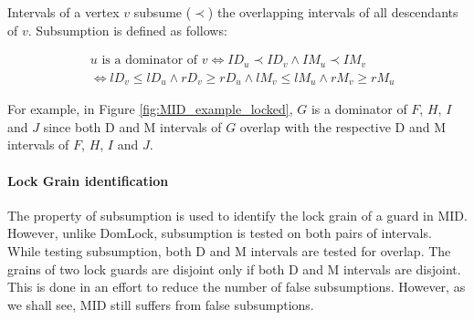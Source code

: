 Intervals of a vertex $v$ subsume ($\prec$) the overlapping intervals of all descendants of $v$. Subsumption is defined as follows:

\begin{equation}
    \begin{split}
        & u \text{ is a dominator of } v \iff ID_u \prec ID_v \land IM_u \prec IM_v
        \\ & \iff lD_v \leq lD_u \land rD_v \geq rD_u \land lM_v \leq lM_u \land rM_v \geq rM_u
    \end{split}
\end{equation}

For example, in Figure \ref{fig:MID_example_locked}, $G$ is a dominator of $F$, $H$, $I$ and $J$ since both D and M intervals of $G$ overlap with the respective D and M intervals of $F$, $H$, $I$ and $J$.

\paragraph{Lock Grain identification}

The property of subsumption is used to identify the lock grain of a guard in MID. However, unlike DomLock, subsumption is tested on both pairs of intervals. While testing subsumption, both D and M intervals are tested for overlap. The grains of two lock guards are disjoint only if both D and M intervals are disjoint. This is done in an effort to reduce the number of false subsumptions. However, as we shall see, MID still suffers from false subsumptions.

    



